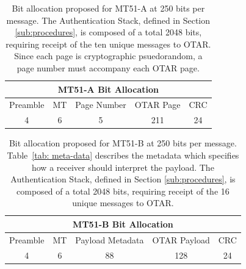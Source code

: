 \documentclass[letterpaper,times]{IONconf/IONconf}
\begin{document}
		\begin{table}%
				\center
				\begin{tabular}{|c|c|c|c|c|} \hline
				\multicolumn{5}{|c|}{MT51-A Bit Allocation} \\ \hline
					Preamble & MT & Page Number & OTAR Page & CRC \\ \hline
					4 & 6 & 5 & 211 & 24 \\ \hline
				\end{tabular}
				\caption{
					Bit allocation proposed for MT51-A at 250 bits per message. 
					The Authentication Stack, defined in Section \ref{sub:procedures}, is composed of a total 2048 bits, requiring receipt of the ten unique messages to OTAR.
					Since each page is cryptographic psuedorandom, a page number must accompany each OTAR page.
				}
				\label{tab: mt51-a}
			\end{table}

		\begin{table}%
			\center
			\begin{tabular}{|c|c|c|c|c|} \hline
				\multicolumn{5}{|c|}{MT51-B Bit Allocation} \\ \hline
				Preamble & MT & Payload Metadata & OTAR Payload & CRC \\ \hline
				4 & 6 & 88 & 128 & 24 \\ \hline
			\end{tabular}
			\caption{
				Bit allocation proposed for MT51-B at 250 bits per message. 
				Table~\ref{tab: meta-data} describes the metadata which specifies how a receiver should interpret the payload.
				The Authentication Stack, defined in Section \ref{sub:procedures}, is composed of a total 2048 bits, requiring receipt of the 16 unique messages to OTAR.
			}
			\label{tab: mt51-b}
		\end{table}
\end{document}
